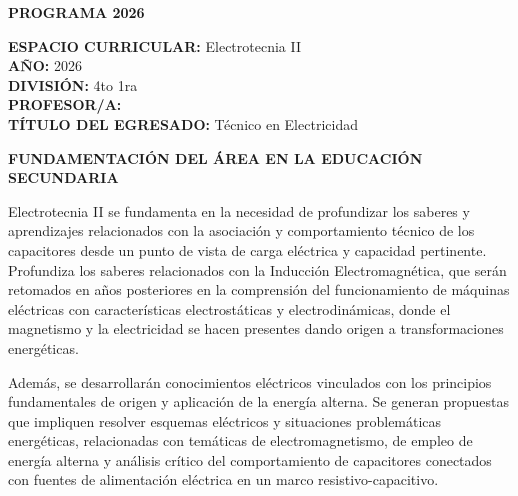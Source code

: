 \documentclass[a4paper,12pt]{article}
\begin{document}
\begin{center}
    \fontsize{14pt}{16pt}\selectfont \textbf{\uppercase{Programa 2026}}
\end{center}

\vspace{0.3cm}

\raggedright
\textbf{ESPACIO CURRICULAR:} Electrotecnia II \\
\textbf{AÑO:} 2026 \\
\textbf{DIVISIÓN:} 4to 1ra \\
\textbf{PROFESOR/A:} \profesor \\
\textbf{TÍTULO DEL EGRESADO:} Técnico en Electricidad

\vspace{0.5cm}

\begin{center}
    \fontsize{12pt}{14pt}\selectfont \textbf{\uppercase{Fundamentación del Área en la Educación Secundaria}}
\end{center}

\fontsize{12pt}{14pt}\selectfont
Electrotecnia II se fundamenta en la necesidad de profundizar los saberes y aprendizajes relacionados con la asociación y comportamiento técnico de los capacitores desde un punto de vista de carga eléctrica y capacidad pertinente. Profundiza los saberes relacionados con la Inducción Electromagnética, que serán retomados en años posteriores en la comprensión del funcionamiento de máquinas eléctricas con características electrostáticas y electrodinámicas, donde el magnetismo y la electricidad se hacen presentes dando origen a transformaciones energéticas.

Además, se desarrollarán conocimientos eléctricos vinculados con los principios fundamentales de origen y aplicación de la energía alterna. Se generan propuestas que impliquen resolver esquemas eléctricos y situaciones problemáticas energéticas, relacionadas con temáticas de electromagnetismo, de empleo de energía alterna y análisis crítico del comportamiento de capacitores conectados con fuentes de alimentación eléctrica en un marco resistivo-capacitivo.

\vspace{0.5cm}
\end{document}
